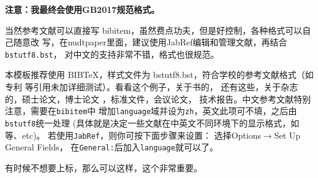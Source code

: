 \textbf{注意：我最终会使用GB2017规范格式。}

当然参考文献可以直接写 bibitem，虽然费点功夫，但是好控制，各种格式可以自己随意改
写，在nudtpaper里面，建议使用JabRef编辑和管理文献，再结合\verb|bstutf8.bst|，
对中文的支持非常不错，格式也很规范。

本模板推荐使用 BIB\TeX，样式文件为 bstutf8.bst，符合学校的参考文献格式（如专利
等引用未加详细测试）。看看这个例子，关于书的，
还有这些，关于杂志的，硕士论文，博士论文
，标准文件，会议论文，%
技术报告。中文参考文献\textsf{特别注意}，需要在\verb|bibitem|中
增加\verb|language|域并设为\verb|zh|，英文此项可不填，之后由\verb|bstutf8|统一处理
(具体就是决定一些文献在中英文不同环境下的显示格式，如等、etc)。
若使用\verb|JabRef|，则你可按下面步骤来设置：
选择\textsf{Options}$\rightarrow$\textsf{Set Up General Fields}，
在\verb|General:|后加入\verb|language|就可以了。

有时候不想要上标，那么可以这样\cite{shaheshang}，这个非常重要。

